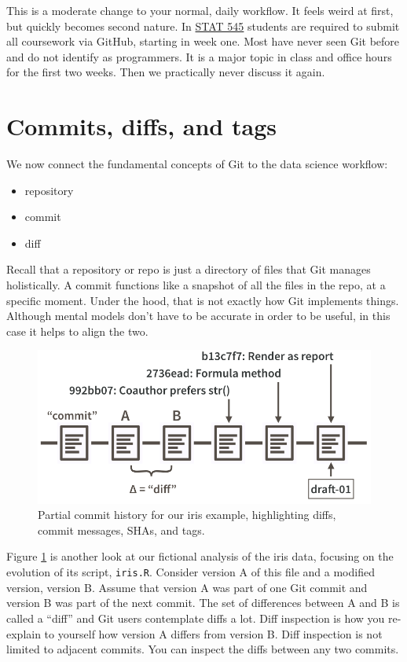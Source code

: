 \documentclass[12pt]{article}
\providecommand{\tightlist}{%
  \setlength{\itemsep}{0pt}\setlength{\parskip}{0pt}}
\begin{document}
This is a moderate change to your normal, daily workflow. It feels weird
at first, but quickly becomes second nature. In
\href{http://stat545.com}{STAT 545} students are required to submit all
coursework via GitHub, starting in week one. Most have never seen Git
before and do not identify as programmers. It is a major topic in class
and office hours for the first two weeks. Then we practically never
discuss it again.

\section{Commits, diffs, and tags}\label{commits-diffs-and-tags}

We now connect the fundamental concepts of Git to the data science
workflow:

\begin{itemize}
\tightlist
\item
  repository
\item
  commit
\item
  diff
\end{itemize}

Recall that a repository or repo is just a directory of files that Git
manages holistically. A commit functions like a snapshot of all the
files in the repo, at a specific moment. Under the hood, that is not
exactly how Git implements things. Although mental models don't have to
be accurate in order to be useful, in this case it helps to align the
two.

\begin{figure}
\includegraphics[width=1\linewidth]{commit-diff-sha-tag} \caption{\label{fig:commit-diff-sha-tag}Partial commit history for our iris example, highlighting diffs, commit messages, SHAs, and tags.}\label{fig:commit-diff-sha-tag}
\end{figure}

Figure \ref{fig:commit-diff-sha-tag} is another look at our fictional
analysis of the iris data, focusing on the evolution of its script,
\texttt{iris.R}. Consider version A of this file and a modified version,
version B. Assume that version A was part of one Git commit and version
B was part of the next commit. The set of differences between A and B is
called a ``diff'' and Git users contemplate diffs a lot. Diff inspection
is how you re-explain to yourself how version A differs from version B.
Diff inspection is not limited to adjacent commits. You can inspect the
diffs between any two commits.
\end{document}
